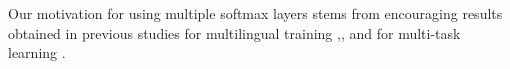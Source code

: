 \documentclass[a4paper]{article}
\begin{document}
Our motivation for using multiple softmax layers stems from encouraging results obtained in previous studies for multilingual training \cite{Scanzio-MultisoftmaxFirstPaper},\cite{Vesely-MultilingualBNF}, \cite{Huang-MultilingualSHL} and  for multi-task learning \cite{Seltzer-MTLPhonemeRecog}. %
\end{document}
